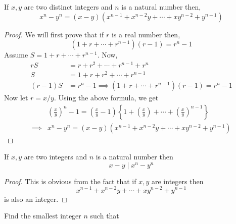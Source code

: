 \begin{theorem}
    If $x,y$ are two distinct integers and $n$ is a natural number then, 
    \[
        x^{n} - y^{n} = (x-y)\left(x^{n-1} + x^{n-2}y + \cdots + xy^{n-2} + y^{n-1}\right)
    \]
\end{theorem}
\begin{proof}
    We will first prove that if $r$ is a real number then, 
    \[
        \left(1 + r + \cdots + r^{n-1}\right)\left( r - 1\right) = r^{n} - 1     
    \]
    Assume $S = 1 + r + \cdots + r^{n-1}$. Now,
    \begin{align*}
        rS       & =      r + r^{2} + \cdots + r^{n-1} + r^{n} \\
        S        & = 1 +  r + r^{2} + \cdots + r^{n-1} \\
        (r - 1)S & = r^{n} - 1 \implies \left(1 + r + \cdots + r^{n-1}\right)\left(r - 1\right) = r^{n} - 1
    \end{align*}
    Now let $r = x/y$. Using the above formula, we get
    \begin{align*}
        & \left( \frac{x}{y} \right)^{n} - 1 = \left( \frac{x}{y} - 1 \right)
        \left\{ 1 + \left(\frac{x}{y}\right) + \cdots + \left(\frac{x}{y}\right)^{n-1} \right\} \\
        \implies  & x^{n} - y^{n} = (x-y)\left(x^{n-1} + x^{n-2}y + \cdots + xy^{n-2} + y^{n-1}\right)
    \end{align*}
\end{proof}

\begin{corollary}
    If $x,y$ are two integers and $n$ is a natural number then
    \[
        x - y \mid x^{n} - y^{n}
    \]
\end{corollary}
\begin{proof}
    This is obvious from the fact that if $x,y$ are integers then
    \[
        x^{n-1} + x^{n-2}y + \cdots + xy^{n-2} + y^{n-1}
    \]
    is also an integer.
\end{proof}

\begin{problem}
    Find the smallest integer $n$ such that 
\end{problem}
